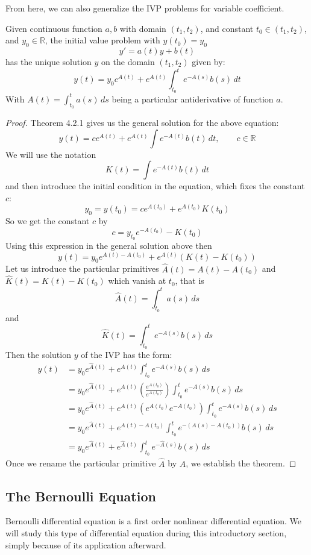 From here, we can also generalize the IVP problems for variable coefficient. 
\begin{definition}
    Given continuous function $a,b$ with domain $(t_{1},t_{2})$, and constant $t_{0}\in(t_{1},t_{2})$, and $y_{0}\in\mathbb{R}$, the initial value problem with $y(t_{0})=y_{0}$ $$y'=a(t)y+b(t)$$ has the unique solution $y$ on the domain $(t_{1},t_{2})$ given by: $$y(t)=y_{0}c^{A(t)}+e^{A(t)}\int^{t}_{t_{0}} e^{-A(s)}b(s)  \, dt $$ With $A(t)=\int^{t}_{t_{0}}a(s) \, ds$ being a particular antiderivative of function $a$. 
\end{definition}
\begin{proof}
    Theorem 4.2.1 gives us the general solution for the above equation: 
$$y(t)=ce^{A(t)}+e^{A(t)}\int e^{-A(t)}b(t) \, dt,\quad\quad c\in \mathbb{R} $$
We will use the notation $$K(t)=\int e^{-A(t)}b(t) \, dt $$
and then introduce the initial condition in the equation, which fixes the constant $c$: 
$$y_{0}=y(t_{0})=ce^{A(t_{0})}+e^{A(t_{0})}K(t_{0})$$
So we get the constant $c$ by 
$$
c=y_{t_{0}}e^{-A(t_{0})}-K(t_{0})
$$
Using this expression in the general solution above then 
$$y(t)=y_{0}e^{A(t)-A(t_{0})}+e^{A(t)}(K(t)-K(t_{0}))$$
Let us introduce the particular primitives $\hat{A}(t)=A(t)-A(t_{0})$ and $\hat{K}(t)=K(t)-K(t_{0})$ which vanish at $t_{0}$, that is
$$\hat{A}(t)=\int ^{t}_{t_{0}}a(s) \, ds $$
and 
$$\hat{K}(t)=\int ^{t}_{t_{0}}e^{-A(s)}b(s) \, ds $$
Then the solution $y$ of the IVP has the form: 
\begin{equation*}
    \begin{split}
        y(t) & = y_{0}e^{\hat{A}(t)}+e^{A(t)}\int ^{t}_{t_{0}}e^{-A(s)}b(s) \, ds\\
        & = y_{0}e^{\hat{A}(t)}+e^{A(t)}\left( \frac{e^{A(t_{0})}}{e^{A(t_{0})}} \right)\int ^{t}_{t_{0}}e^{-A(s)}b(s) \, ds\\
        & = y_{0}e^{\hat{A}(t)}+e^{A(t)}( e^{A(t_{0})}e^{-A(t_{0})} )\int ^{t}_{t_{0}}e^{-A(s)}b(s) \, ds\\
        & = y_{0}e^{\hat{A}(t)}+e^{A(t)-A(t_{0})}\int ^{t}_{t_{0}}e^{-(A(s)-A(t_{0}))}b(s) \, ds\\
        & = y_{0}e^{\hat{A}(t)}+e^{\hat{A}(t)}\int ^{t}_{t_{0}}e^{-\hat{A}(s)}b(s) \, ds
        \end{split}
\end{equation*}
Once we rename the particular primitive $\hat{A}$ by $A$, we establish the theorem. 
\end{proof}
\subsection{The Bernoulli Equation}
Bernoulli differential equation  is a first order nonlinear differential equation. We will study this type of differential equation during this introductory section, simply because of its application afterward. 

